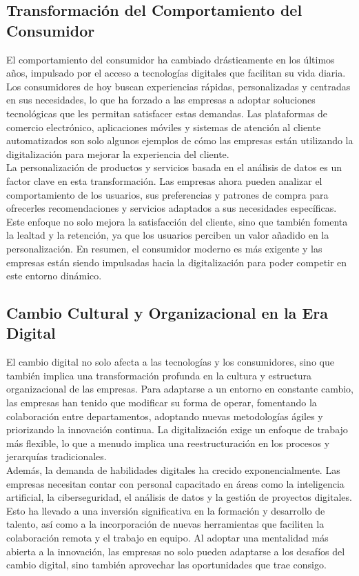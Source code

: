 \documentclass{article}
\begin{document}
\subsection{Transformación del Comportamiento del Consumidor}
El comportamiento del consumidor ha cambiado drásticamente en los últimos años, impulsado por el acceso a tecnologías digitales que facilitan su vida diaria. Los consumidores de hoy buscan experiencias rápidas, personalizadas y centradas en sus necesidades, lo que ha forzado a las empresas a adoptar soluciones tecnológicas que les permitan satisfacer estas demandas. Las plataformas de comercio electrónico, aplicaciones móviles y sistemas de atención al cliente automatizados son solo algunos ejemplos de cómo las empresas están utilizando la digitalización para mejorar la experiencia del cliente.\\

La personalización de productos y servicios basada en el análisis de datos es un factor clave en esta transformación. Las empresas ahora pueden analizar el comportamiento de los usuarios, sus preferencias y patrones de compra para ofrecerles recomendaciones y servicios adaptados a sus necesidades específicas. Este enfoque no solo mejora la satisfacción del cliente, sino que también fomenta la lealtad y la retención, ya que los usuarios perciben un valor añadido en la personalización. En resumen, el consumidor moderno es más exigente y las empresas están siendo impulsadas hacia la digitalización para poder competir en este entorno dinámico.\\

\subsection{Cambio Cultural y Organizacional en la Era Digital}
El cambio digital no solo afecta a las tecnologías y los consumidores, sino que también implica una transformación profunda en la cultura y estructura organizacional de las empresas. Para adaptarse a un entorno en constante cambio, las empresas han tenido que modificar su forma de operar, fomentando la colaboración entre departamentos, adoptando nuevas metodologías ágiles y priorizando la innovación continua. La digitalización exige un enfoque de trabajo más flexible, lo que a menudo implica una reestructuración en los procesos y jerarquías tradicionales.\\

Además, la demanda de habilidades digitales ha crecido exponencialmente. Las empresas necesitan contar con personal capacitado en áreas como la inteligencia artificial, la ciberseguridad, el análisis de datos y la gestión de proyectos digitales. Esto ha llevado a una inversión significativa en la formación y desarrollo de talento, así como a la incorporación de nuevas herramientas que faciliten la colaboración remota y el trabajo en equipo. Al adoptar una mentalidad más abierta a la innovación, las empresas no solo pueden adaptarse a los desafíos del cambio digital, sino también aprovechar las oportunidades que trae consigo.\\
\end{document}
